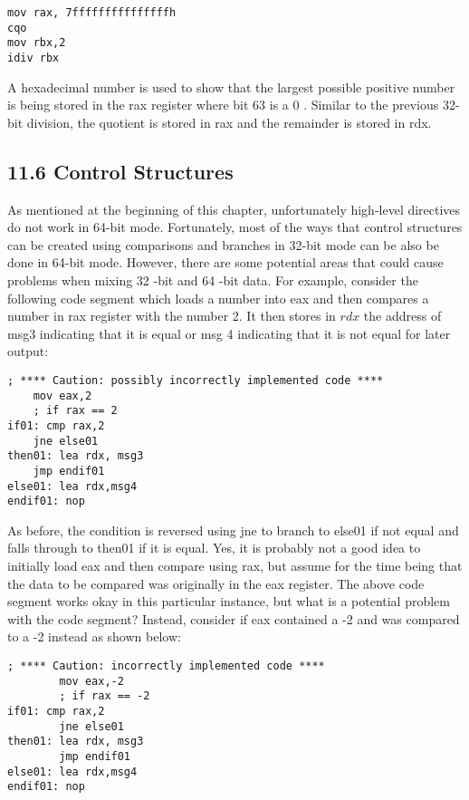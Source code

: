 \documentclass[10pt]{article}
\begin{document}
\begin{verbatim}
mov rax, 7fffffffffffffffh
cqo
mov rbx,2
idiv rbx
\end{verbatim}

A hexadecimal number is used to show that the largest possible positive number is being stored in the rax register where bit 63 is a 0 . Similar to the previous 32-bit division, the quotient is stored in rax and the remainder is stored in rdx.

\subsection*{11.6 Control Structures}
As mentioned at the beginning of this chapter, unfortunately high-level directives do not work in 64-bit mode. Fortunately, most of the ways that control structures can be created using comparisons and branches in 32-bit mode can be also be done in 64-bit mode. However, there are some potential areas that could cause problems when mixing 32 -bit and 64 -bit data. For example, consider the following code segment which loads a number into eax and then compares a number in rax register with the number 2. It then stores in $r d x$ the address of msg3 indicating that it is equal or msg 4 indicating that it is not equal for later output:

\begin{verbatim}
; **** Caution: possibly incorrectly implemented code ****
    mov eax,2
    ; if rax == 2
if01: cmp rax,2
    jne else01
then01: lea rdx, msg3
    jmp endif01
else01: lea rdx,msg4
endif01: nop
\end{verbatim}

As before, the condition is reversed using jne to branch to else01 if not equal and falls through to then01 if it is equal. Yes, it is probably not a good idea to initially load eax and then compare using rax, but assume for the time being that the data to be compared was originally in the eax register. The above code segment works okay in this particular instance, but what is a potential problem with the code segment? Instead, consider if eax contained a -2 and was compared to a -2 instead as shown below:

\begin{verbatim}
; **** Caution: incorrectly implemented code ****
        mov eax,-2
        ; if rax == -2
if01: cmp rax,2
        jne else01
then01: lea rdx, msg3
        jmp endif01
else01: lea rdx,msg4
endif01: nop
\end{verbatim}
\end{document}
